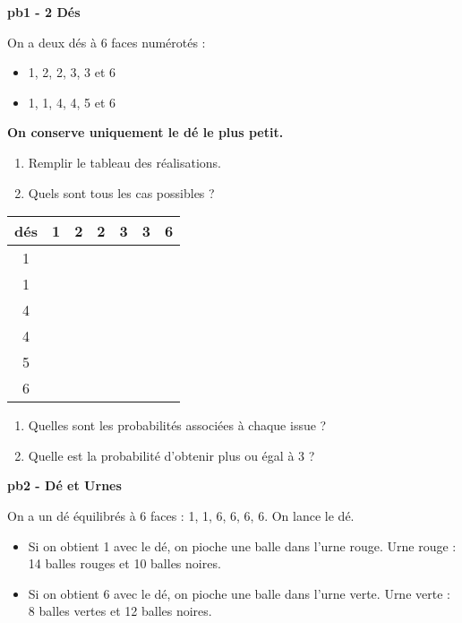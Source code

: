 \textbf{pb1 - 2 Dés}

\begin{multicols}{2}\noindent
  On a deux dés à 6 faces numérotés : 
  \begin{itemize}[label={$\bullet$}]
    \item 1, 2, 2, 3, 3 et 6
    \item 1, 1, 4, 4, 5 et 6
  \end{itemize}

  \textbf{On conserve uniquement le dé le plus petit.} 
  \begin{enumerate}
    \item[1.] Remplir le tableau des réalisations.
    \item[2.] Quels sont tous les cas possibles ? 
  \end{enumerate}  
  \columnbreak 
  
  \begin{center}\begin{tabular}{|c|c|c|c|c|c|c|} \hline
    dés & 1 & 2 & 2 & 3 & 3 & 6 \\  \hline
      1 &   &   &   &   &   &   \\  \hline
      1 &   &   &   &   &   &   \\  \hline
      4 &   &   &   &   &   &   \\  \hline
      4 &   &   &   &   &   &   \\  \hline
      5 &   &   &   &   &   &   \\  \hline
      6 &   &   &   &   &   &   \\  \hline
  \end{tabular}\end{center}
  
  \end{multicols}
  
  \Pointilles[3] 
  \begin{enumerate}
    \item[3.] Quelles sont les probabilités associées à chaque issue ? \\ \Pointilles[6]
    \item[4.] Quelle est la probabilité d'obtenir plus ou égal à 3 ?\\ \Pointilles[3]  
  \end{enumerate}  


  \textbf{pb2 - Dé et Urnes}

  On a un dé équilibrés à 6 faces : 1, 1, 6, 6, 6, 6. On lance le dé. 
  
  \begin{multicols}{2}\noindent
  \begin{itemize}[label={$\bullet$}]
    \item Si on obtient 1 avec le dé, on pioche une balle dans l'urne rouge.
    Urne rouge : 14 balles rouges et 10 balles noires.
  
    \item Si on obtient 6 avec le dé, on pioche une balle dans l'urne verte.
    Urne verte : 8 balles vertes et 12 balles noires.
  \end{itemize}
  \end{multicols}
  
